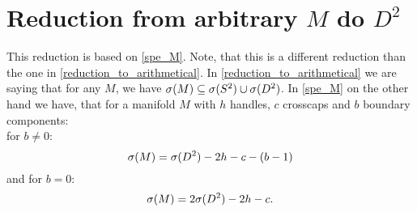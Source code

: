 \section{Reduction from arbitrary $M$ do $D^2$}
This reduction is based on \ref{spe_M}.
Note, that this is a different reduction than the one in \ref{reduction_to_arithmetical}. 
In \ref{reduction_to_arithmetical} we are saying that for any $M$, we have ${{\sigma}(M)} 
\subseteq {{\sigma}(S^2)} \cup {{\sigma}(D^2)}$. In \ref{spe_M} on the other hand we have, that 
for a manifold $M$ with $h$ handles, $c$ crosscaps and $b$ boundary components: \\
for $b \neq 0$:
\begin{equation}
{\sigma}(M) = {{\sigma}(D^2)} - 2h - c - (b - 1)
\end{equation}
and for $b = 0$:
\begin{equation}
{\sigma}(M) = 2{{\sigma}(D^2)} - 2h - c.
\end{equation}  


